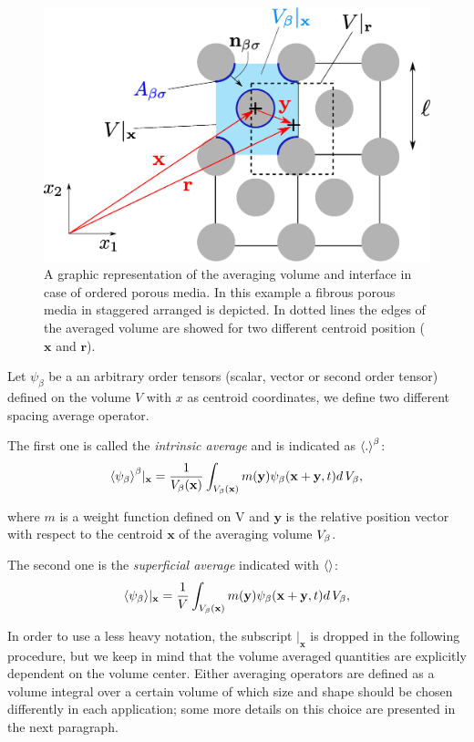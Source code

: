 \begin{figure}[h!]
	\centering
	\includegraphics[width=0.7\linewidth]{chapter_2/figure/REV}
	\caption{A graphic representation of the averaging volume and interface in case of ordered porous media. In this example a fibrous  porous media in staggered arranged is depicted. In dotted lines the edges of the averaged volume are showed for two different centroid position ($\mathbf{x}$ and $\mathbf{r}$).}
	\label{fig:rev}
\end{figure}

Let $\psi_{\beta}$ be a an arbitrary order tensors (scalar, vector or second order tensor) defined on the volume $V$ with $x$ as centroid coordinates, we define two different spacing average operator.

The first one is called the \textit{intrinsic average} and is indicated as ${\left< . \right>}^{\beta}$:
\begin{equation}
	{\left< \psi_{\beta} \right>}^{\beta}|_{\mathbf{x}} = \dfrac{1}{V_\beta(\mathbf{x})} \int_{V_\beta(\mathbf{x})}  m(\mathbf{y}) \psi_{\beta}(\mathbf{x}+\mathbf{y}, t) d \, V_\beta,
	\label{eq:avg_intrinsic}
\end{equation}

where $m$ is a weight function defined on V and $\mathbf{y}$ is the relative position vector with respect to the centroid $\mathbf{x}$ of the averaging volume $V_\beta$.

The second one is the \textit{superficial average} indicated with ${\left<  \right>}$:
\begin{equation}
	{\left< \psi_{\beta} \right>}|_{\mathbf{x}} = \dfrac{1}{V} \int_{V_\beta(\mathbf{x})} m(\mathbf{y}) \psi_{\beta}(\mathbf{x}+\mathbf{y}, t) d \, V_\beta,
	\label{eq:avg_superficial}
\end{equation}

In order to use a less heavy notation, the subscript $|_{\mathbf{x}}$ is dropped in the following procedure, but we keep in mind that the volume averaged quantities are explicitly dependent on the volume center.
Either averaging operators are defined as a volume integral over a certain volume of which size and shape should be chosen differently in each application; some more details on this choice are presented in the next paragraph.

